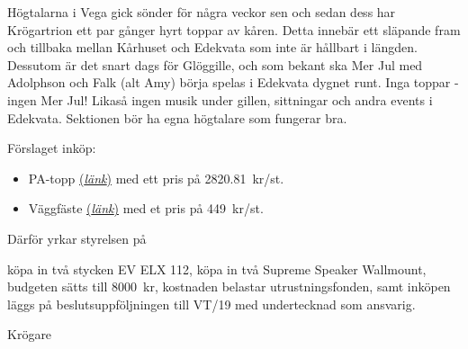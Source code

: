 \documentclass[../_main/handlingar.tex]{subfiles}
\begin{document}

Högtalarna i Vega gick sönder för några veckor sen och sedan dess har Krögartrion ett par gånger hyrt toppar av kåren. Detta innebär ett släpande fram och tillbaka mellan Kårhuset och Edekvata som inte är hållbart i längden. Dessutom är det snart dags för Glöggille, och som bekant ska Mer Jul med Adolphson och Falk (alt Amy) börja spelas i Edekvata dygnet runt. Inga toppar - ingen Mer Jul! Likaså ingen musik under gillen, sittningar och andra events i Edekvata. Sektionen bör ha egna högtalare som fungerar bra.

Förslaget inköp:
\begin{itemize}
    \item PA-topp \href{https://m.thomann.de/se/ev_elx_112.htm?o=24&search=1541764173&fbclid=IwAR1RXv6VMtJp_rHFNn5ySXXCyuJfUqW5omXFERKKrRKsftpNXIRyFdHXh1w}{(\textit{länk})} med ett pris på \SI{2820,81}{kr/st}.
    \item Väggfäste \href{https://www.4sound.se/pa/tillbehoer/stativ-faesten/supreme-speaker-wallmount?fbclid=IwAR0mB0Ru6crnqygrZulmNiAmRP75zCXhK6O8mRm-OaSOvDiEQyBMwH_vMLg}{(\textit{länk})} med et pris på \SI{449}{kr/st}. 
\end{itemize} 

Därför yrkar styrelsen på

\begin{attsatser}
    \att köpa in två stycken EV ELX 112,
    \att köpa in två Supreme Speaker Wallmount,
    \att budgeten sätts till \SI{8000}{kr},
    \att kostnaden belastar utrustningsfonden, samt
    \att inköpen läggs på beslutsuppföljningen till VT/19 med undertecknad som ansvarig.
\end{attsatser}

\begin{signatures}{1}
    \ist
    \signature{Malin Heyden}{Krögare}
\end{signatures}
\end{document}
